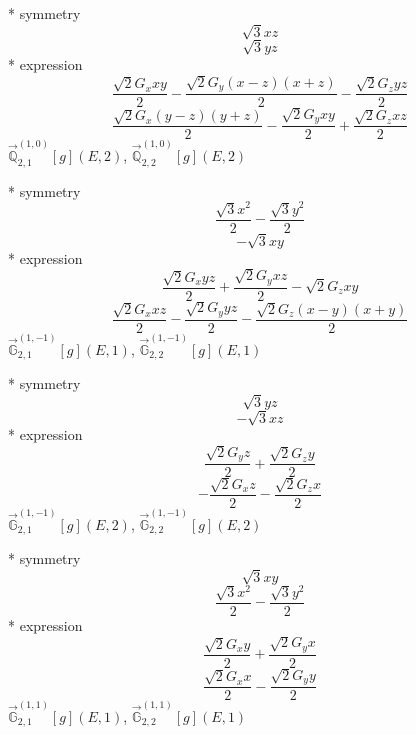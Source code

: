\documentclass[fleqn,8pt]{jsarticle}
\begin{document}
\noindent\quad ** symmetry
\begin{dmath*}
\sqrt{3} x z
\end{dmath*}
\begin{dmath*}
\sqrt{3} y z
\end{dmath*}
\noindent\quad ** expression
\begin{dmath*}
\frac{\sqrt{2} G_{x} x y}{2} - \frac{\sqrt{2} G_{y} \left(x - z\right) \left(x + z\right)}{2} - \frac{\sqrt{2} G_{z} y z}{2}
\end{dmath*}
\begin{dmath*}
\frac{\sqrt{2} G_{x} \left(y - z\right) \left(y + z\right)}{2} - \frac{\sqrt{2} G_{y} x y}{2} + \frac{\sqrt{2} G_{z} x z}{2}
\end{dmath*}
\noindent\quad $\vec{\mathbb{Q}}_{2,1}^{(1,0)}[g](E,2)$, $\vec{\mathbb{Q}}_{2,2}^{(1,0)}[g](E,2)$

\noindent\quad ** symmetry
\begin{dmath*}
\frac{\sqrt{3} x^{2}}{2} - \frac{\sqrt{3} y^{2}}{2}
\end{dmath*}
\begin{dmath*}
- \sqrt{3} x y
\end{dmath*}
\noindent\quad ** expression
\begin{dmath*}
\frac{\sqrt{2} G_{x} y z}{2} + \frac{\sqrt{2} G_{y} x z}{2} - \sqrt{2} G_{z} x y
\end{dmath*}
\begin{dmath*}
\frac{\sqrt{2} G_{x} x z}{2} - \frac{\sqrt{2} G_{y} y z}{2} - \frac{\sqrt{2} G_{z} \left(x - y\right) \left(x + y\right)}{2}
\end{dmath*}
\noindent\quad $\vec{\mathbb{G}}_{2,1}^{(1,-1)}[g](E,1)$, $\vec{\mathbb{G}}_{2,2}^{(1,-1)}[g](E,1)$

\noindent\quad ** symmetry
\begin{dmath*}
\sqrt{3} y z
\end{dmath*}
\begin{dmath*}
- \sqrt{3} x z
\end{dmath*}
\noindent\quad ** expression
\begin{dmath*}
\frac{\sqrt{2} G_{y} z}{2} + \frac{\sqrt{2} G_{z} y}{2}
\end{dmath*}
\begin{dmath*}
- \frac{\sqrt{2} G_{x} z}{2} - \frac{\sqrt{2} G_{z} x}{2}
\end{dmath*}
\noindent\quad $\vec{\mathbb{G}}_{2,1}^{(1,-1)}[g](E,2)$, $\vec{\mathbb{G}}_{2,2}^{(1,-1)}[g](E,2)$

\noindent\quad ** symmetry
\begin{dmath*}
\sqrt{3} x y
\end{dmath*}
\begin{dmath*}
\frac{\sqrt{3} x^{2}}{2} - \frac{\sqrt{3} y^{2}}{2}
\end{dmath*}
\noindent\quad ** expression
\begin{dmath*}
\frac{\sqrt{2} G_{x} y}{2} + \frac{\sqrt{2} G_{y} x}{2}
\end{dmath*}
\begin{dmath*}
\frac{\sqrt{2} G_{x} x}{2} - \frac{\sqrt{2} G_{y} y}{2}
\end{dmath*}
\noindent\quad $\vec{\mathbb{G}}_{2,1}^{(1,1)}[g](E,1)$, $\vec{\mathbb{G}}_{2,2}^{(1,1)}[g](E,1)$
\end{document}
